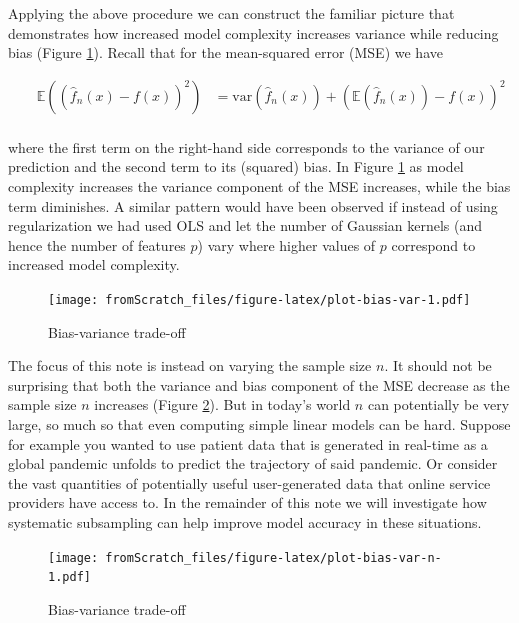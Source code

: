 \documentclass[
]{book}
\begin{document}
Applying the above procedure we can construct the familiar picture that demonstrates how increased model complexity increases variance while reducing bias (Figure \ref{fig:plot-bias-var}). Recall that for the mean-squared error (MSE) we have

\[
\begin{equation} 
\begin{aligned}
&& \mathbb{E} \left( (\hat{f}_n(x)-f(x))^2 \right)
&= \text{var} (\hat{f}_n(x)) + \left( \mathbb{E} \left( \hat{f}_n(x) \right) - f(x) \right)^2 \\
\end{aligned}
\label{eq:mse}
\end{equation}
\]

where the first term on the right-hand side corresponds to the variance of our prediction and the second term to its (squared) bias. In Figure \ref{fig:plot-bias-var} as model complexity increases the variance component of the MSE increases, while the bias term diminishes. A similar pattern would have been observed if instead of using regularization we had used OLS and let the number of Gaussian kernels (and hence the number of features \(p\)) vary where higher values of \(p\) correspond to increased model complexity.

\begin{figure}
\centering
\texttt{[image: fromScratch\_files/figure-latex/plot-bias-var-1.pdf]}
\caption{\label{fig:plot-bias-var}Bias-variance trade-off}
\end{figure}

The focus of this note is instead on varying the sample size \(n\). It should not be surprising that both the variance and bias component of the MSE decrease as the sample size \(n\) increases (Figure \ref{fig:plot-bias-var-n}). But in today's world \(n\) can potentially be very large, so much so that even computing simple linear models can be hard. Suppose for example you wanted to use patient data that is generated in real-time as a global pandemic unfolds to predict the trajectory of said pandemic. Or consider the vast quantities of potentially useful user-generated data that online service providers have access to. In the remainder of this note we will investigate how systematic subsampling can help improve model accuracy in these situations.

\begin{figure}
\centering
\texttt{[image: fromScratch\_files/figure-latex/plot-bias-var-n-1.pdf]}
\caption{\label{fig:plot-bias-var-n}Bias-variance trade-off}
\end{figure}
\end{document}
